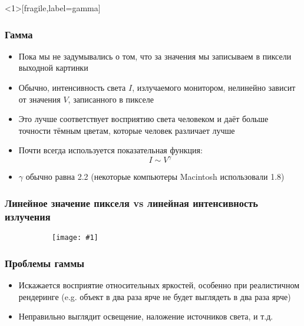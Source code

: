 \documentclass[10pt]{beamer}
\newcommand{\slideimage}[1]{
  \begin{figure}
    \begin{adjustbox}{width=\textwidth, totalheight=\textheight-2\baselineskip-2\baselineskip,keepaspectratio}
      \texttt{[image: \#1]}
    \end{adjustbox}
  \end{figure}
}
\begin{document}
\begin{frame}<1>[fragile,label=gamma]
\frametitle{Гамма}
\begin{itemize}
\item Пока мы не задумывались о том, что за значения мы записываем в пиксели выходной картинки
\pause
\item Обычно, интенсивность света \begin{math}I\end{math}, излучаемого монитором, нелинейно зависит от значения \begin{math}V\end{math}, записанного в пикселе
\pause
\item Это лучше соответствует восприятию света человеком и даёт больше точности тёмным цветам, которые человек различает лучше
\pause
\item Почти всегда используется показательная функция:
\begin{equation}I \sim V^\gamma\end{equation}
\pause
\item \begin{math}\gamma\end{math} обычно равна 2.2 (некоторые компьютеры Macintosh использовали 1.8)
\end{itemize}
\end{frame}

\begin{frame}
\frametitle{Линейное значение пикселя vs линейная интенсивность излучения}
\begin{figure}
\slideimage{gamma-scale.png}
\end{figure}
\end{frame}


\begin{frame}[fragile,label=gamma2]
\frametitle{Проблемы гаммы}
\begin{itemize}
\item Искажается восприятие относительных яркостей, особенно при реалистичном рендеринге (e.g. объект в два раза ярче не будет выглядеть в два раза ярче)
\pause
\item Неправильно выглядит освещение, наложение источников света, и т.д.
\end{itemize}
\end{frame}
\end{document}
